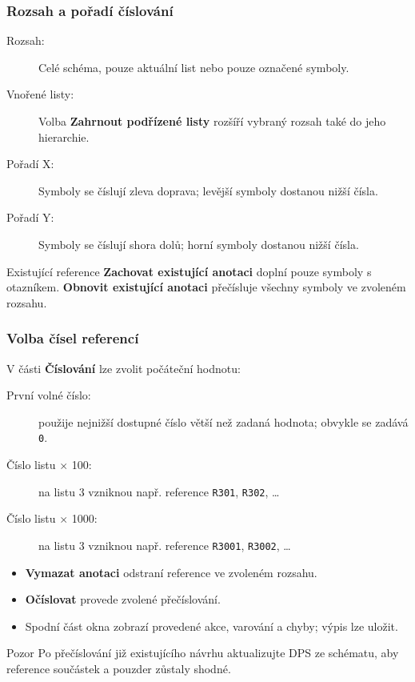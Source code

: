 \documentclass{beamer}
\begin{document}
\begin{frame}
	\frametitle{Rozsah a pořadí číslování}
	\begin{description}
		\item[Rozsah:] Celé schéma, pouze aktuální list nebo pouze označené symboly.
		\item[Vnořené listy:] Volba \textbf{Zahrnout podřízené listy} rozšíří vybraný rozsah také do jeho hierarchie.
		\item[Pořadí X:] Symboly se číslují zleva doprava; levější symboly dostanou nižší čísla.
		\item[Pořadí Y:] Symboly se číslují shora dolů; horní symboly dostanou nižší čísla.
	\end{description}

	\vfill
	\begin{block}{Existující reference}
		\textbf{Zachovat existující anotaci} doplní pouze symboly s otazníkem. \textbf{Obnovit existující anotaci} přečísluje všechny symboly ve zvoleném rozsahu.
	\end{block}
\end{frame}

\begin{frame}
	\frametitle{Volba čísel referencí}
	V části \textbf{Číslování} lze zvolit počáteční hodnotu:
	\begin{description}
		\item[První volné číslo:] použije nejnižší dostupné číslo větší než zadaná hodnota; obvykle se zadává \texttt{0}.
		\item[Číslo listu $\times$ 100:] na listu 3 vzniknou např. reference \texttt{R301}, \texttt{R302}, \ldots
		\item[Číslo listu $\times$ 1000:] na listu 3 vzniknou např. reference \texttt{R3001}, \texttt{R3002}, \ldots
	\end{description}

	\medskip
	\begin{itemize}
		\item \textbf{Vymazat anotaci} odstraní reference ve zvoleném rozsahu.
		\item \textbf{Očíslovat} provede zvolené přečíslování.
		\item Spodní část okna zobrazí provedené akce, varování a chyby; výpis lze uložit.
	\end{itemize}

	\vfill
	\begin{alertblock}{Pozor}
		Po přečíslování již existujícího návrhu aktualizujte DPS ze schématu, aby reference součástek a pouzder zůstaly shodné.
	\end{alertblock}
\end{frame}
\end{document}
